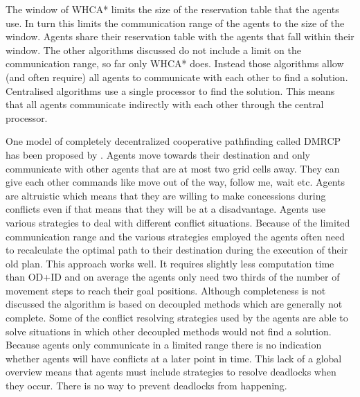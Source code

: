 The window of WHCA* limits the size of the reservation table that the agents 
use. In turn this limits the communication range of the agents to the size of 
the window.
Agents share their reservation table with the agents that fall within their 
window.
The other algorithms discussed do not include a limit on the communication 
range, so far only WHCA* does. Instead those algorithms allow (and often 
require) all 
agents to communicate with 
each other to find a solution. Centralised algorithms use a single processor to 
find the solution. This means that all agents communicate indirectly with each 
other through the central processor.

One model of completely decentralized cooperative pathfinding called DMRCP has
been proposed by \cite{wei2016}. Agents move towards their destination and only
communicate with other agents that are at most two grid cells away. They can
give each other commands like
move out of the way, follow me, wait etc. Agents are altruistic which means
that they are willing to make concessions during conflicts even if that means
that they will be at a disadvantage. Agents use various strategies to deal with
different conflict situations. Because of the limited communication range and
the various strategies employed the agents often need to recalculate the
optimal path to their destination during the execution of their old plan. This
approach works well. It requires slightly less computation time than OD+ID and
on average the agents only need two thirds of the number of movement steps to
reach their goal positions. Although completeness is not discussed the
algorithm is based on decoupled methods which are generally not complete. Some
of the conflict resolving strategies used by the agents are able to solve
situations in which other decoupled methods would not find a solution.
Because agents only communicate in a limited range there is no indication
whether agents will have conflicts at a later point in time. This lack of a
global overview means that agents must include strategies to resolve deadlocks
when they occur. There is no way to prevent deadlocks from happening.


